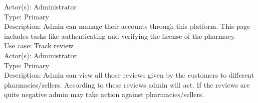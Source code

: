 \documentclass{article}
\begin{document}
Actor(s):     Administrator   \\                                         
Type:           Primary \\                                            
 Description:  Admin  can manage their accounts through this platform. This page includes tasks like authenticating and verifying the license of the pharmacy. 
\vspace{0.5cm}
\\Use case:    Track review \\
Actor(s):      Administrator  \\                                         
Type:            Primary      \\                           
Description:  Admin can view all those reviews given by the customers to different pharmacies/sellers. According to these reviews admin will act. If the reviews are quite negative admin may take action against pharmacies/sellers.                                                                                                        
\end{document}
